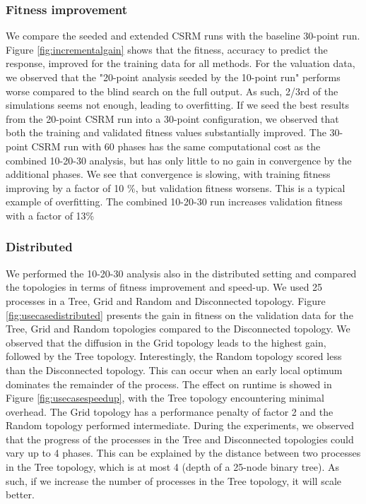 \subsubsection{Fitness improvement}
We compare the seeded and extended CSRM runs with the baseline 30-point run.  Figure \ref{fig:incrementalgain} shows that the fitness, accuracy to predict the response, improved for the training data for all methods. For the valuation data, we observed that the "20-point analysis seeded by the 10-point run" performs worse compared to the blind search on the full output. As such, 2/3rd of the simulations seems not enough, leading to overfitting. If we seed the best results from the 20-point CSRM run into a 30-point configuration, we observed that both the training and validated fitness values substantially improved. The 30-point CSRM run with 60 phases has the same computational cost as the combined 10-20-30 analysis, but has only little to no gain in convergence by the additional phases. We see that convergence is slowing, with training fitness improving by a factor of 10 \%, but validation fitness worsens. %
This is a typical example of overfitting. The combined 10-20-30 run increases validation fitness with a factor of 13\%

\subsubsection{Distributed}
We performed the 10-20-30 analysis also in the distributed setting and compared the topologies in terms of fitness improvement and speed-up. We used 25 processes in a Tree, Grid and Random and   Disconnected topology. Figure \ref{fig:usecasedistributed} presents the gain in fitness on the validation data for the Tree, Grid and Random topologies compared to the Disconnected topology. We observed that the diffusion in the Grid topology leads to the highest gain, followed by the Tree topology. Interestingly, the Random topology scored less than the Disconnected topology. This can occur when an early local optimum dominates the remainder of the process. The effect on runtime is showed in Figure \ref{fig:usecasespeedup}, with the Tree topology encountering minimal overhead. The Grid topology has a performance penalty of factor 2 and the Random topology performed intermediate. During the experiments, we observed that the progress of the processes in the Tree and Disconnected topologies could vary up to 4 phases. This can be explained by the distance between two processes in the Tree topology, which is at most 4 (depth of a 25-node binary tree). As such, if we increase the number of processes in the Tree topology, it will scale better. %

